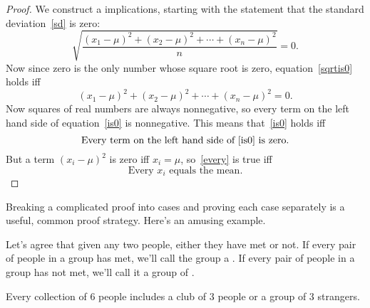 \begin{proof}
We construct a  implications, starting with the
statement that the standard deviation~\eqref{sd} is zero:
%
\begin{equation}\label{sqrtis0}
\sqrt{\frac{(x_1 - \mu)^2 + (x_2 - \mu)^2 + \cdots + (x_n - \mu)^2}{n}} = 0.
\end{equation}
%
Now since zero is the only number whose square root is zero,
equation~\eqref{sqrtis0} holds iff
\begin{equation}\label{is0}
(x_1 - \mu)^2 + (x_2 - \mu)^2 + \cdots + (x_n - \mu)^2 = 0.
\end{equation}
Now squares of real numbers are always nonnegative, so every term on the
left hand side of equation~\eqref{is0} is nonnegative.  This means
that~\eqref{is0} holds iff
\begin{equation}\label{every}
\text{Every term on the left hand side of~\eqref{is0} is zero.}
\end{equation}
But a term $(x_i - \mu)^2$ is zero iff $x_i=\mu$, so~\eqref{every} is true
iff
\[
\text{Every $x_i$ equals the mean.}
\]

\end{proof}

\iffalse

\begin{notesproblem}
Reformulate the proof of the Distributive Law for Sets as a chain of
if-and-only-if implications.
\end{notesproblem}
\fi


Breaking a complicated proof into cases and proving each case separately
is a useful, common proof strategy.  Here's an amusing example.

Let's agree that given any two people, either they have met or not.  If
every pair of people in a group has met, we'll call the group a
.  If every pair of people in a group has not met, we'll call
it a group of .

\begin{theorem*}
Every collection of 6 people includes a club of 3 people or a group of 3
strangers.
\end{theorem*}

